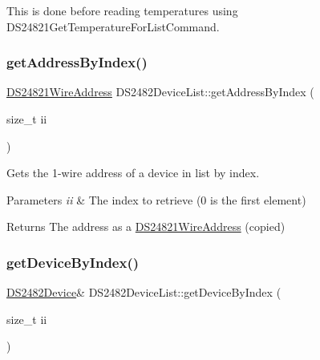 This is done before reading temperatures using D\+S24821\+Get\+Temperature\+For\+List\+Command. \mbox{\label{class_d_s2482_device_list_a6957f627e300638c9d25313664bc65e1}} 
\subsubsection{\texorpdfstring{get\+Address\+By\+Index()}{getAddressByIndex()}}
{\footnotesize\ttfamily \mbox{\hyperlink{class_d_s24821_wire_address}{D\+S24821\+Wire\+Address}} D\+S2482\+Device\+List\+::get\+Address\+By\+Index (\begin{DoxyParamCaption}\item[{size\+\_\+t}]{ii }\end{DoxyParamCaption})\hspace{0.3cm}{\ttfamily [inline]}}



Gets the 1-\/wire address of a device in list by index. 


\begin{DoxyParams}{Parameters}
{\em ii} & The index to retrieve (0 is the first element)\\
\hline
\end{DoxyParams}
\begin{DoxyReturn}{Returns}
The address as a \mbox{\hyperlink{class_d_s24821_wire_address}{D\+S24821\+Wire\+Address}} (copied) 
\end{DoxyReturn}
\mbox{\label{class_d_s2482_device_list_af135ad9891b100429037bb4101ae7ba6}} 
\subsubsection{\texorpdfstring{get\+Device\+By\+Index()}{getDeviceByIndex()}\hspace{0.1cm}{\footnotesize\ttfamily [1/2]}}
{\footnotesize\ttfamily \mbox{\hyperlink{class_d_s2482_device}{D\+S2482\+Device}}\& D\+S2482\+Device\+List\+::get\+Device\+By\+Index (\begin{DoxyParamCaption}\item[{size\+\_\+t}]{ii }\end{DoxyParamCaption})\hspace{0.3cm}{\ttfamily [inline]}}



